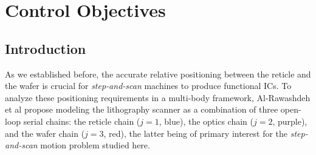 \def\baselinestretch{1}

\chapter{Control Objectives}

\def\baselinestretch{1.66}

\section{Introduction}

As we established before, the accurate relative positioning between the reticle and the wafer is crucial for \textit{step-and-scan} machines to produce functional ICs. To analyze these positioning requirements in a multi-body framework, Al-Rawashdeh et al \cite{Al-Rawashdeh2022_Caracterization} propose modeling the lithography scanner as a combination of three open-loop serial chains: the reticle chain ($j=1$, blue), the optics chain ($j=2$, purple), and the wafer chain ($j=3$, red), the latter being of primary interest for the \textit{step-and-scan} motion problem studied here.